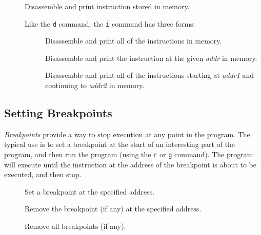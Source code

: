 \begin{description}
\item[\Large {}]

	Disassemble and print instruction stored in memory.

	Like the {\tt d} command, the {\tt i} command has three forms:

	\begin{description}

	\item []

		Disassemble and print all of the instructions in
		memory.

	\item []

		Disassemble and print the instruction at the given
		{\em addr} in memory.

	\item []

		Disassemble and print all of the instructions starting
		at {\em addr1} and continuing to {\em addr2} in
		memory.

	\end{description}

\end{description}

\subsection{Setting Breakpoints}

{\em Breakpoints} provide a way to stop execution at any point in the
program.  The typical use is to set a breakpoint at the start of an
interesting part of the program, and then run the program (using the
{\tt r} or {\tt g} command).  The program will execute until the
instruction at the address of the breakpoint is about to be executed,
and then stop.

\begin{description}

\item[\Large {}]

	Set a breakpoint at the specified address.

\item[\Large {}]

	Remove the breakpoint (if any) at the specified address.

\item[\Large {}]

	Remove all breakpoints (if any).

\end{description}

